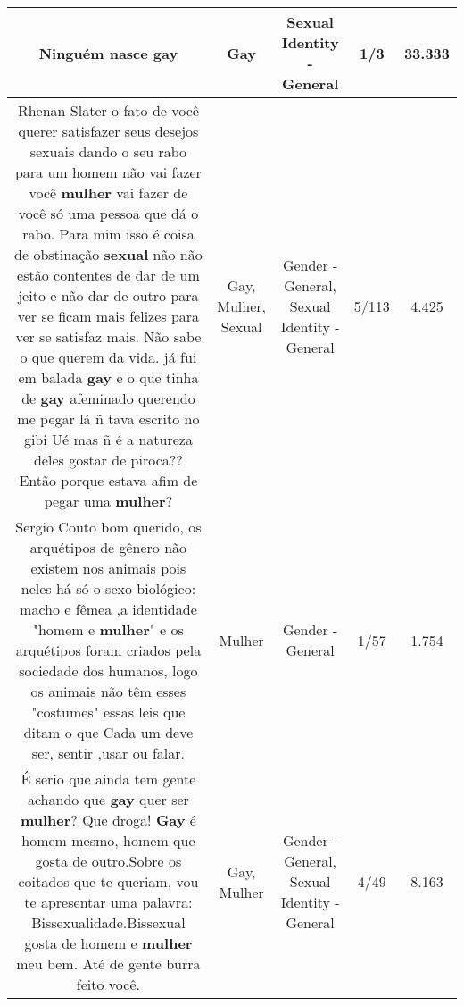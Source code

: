 \documentclass[11pt]{article}
\newlength\mylength
\begin{document}
\begin{center}
\begin{longtable}{|C{.65\mylength}|C{.30\mylength}|C{.12\mylength}|C{.12\mylength}|C{.12\mylength}|}
  \small Ninguém nasce gay\normalsize   & Gay & Sexual Identity - General & 1/3 & 33.333 \\  \hline
  \small Rhenan Slater o fato de você querer satisfazer seus desejos sexuais dando o seu rabo para um homem não vai fazer você \textbf{mulher} vai fazer de você só uma pessoa que dá o rabo. Para mim isso é coisa de obstinação \textbf{sexual} não não estão contentes de dar de um jeito e não dar de outro para ver se ficam mais felizes para ver se satisfaz mais. Não sabe o que querem da vida.  já fui em balada \textbf{gay} e o que tinha de \textbf{gay} afeminado querendo me pegar lá ñ tava escrito no gibi Ué mas ñ é a natureza deles gostar de piroca?? Então porque estava afim de pegar uma \textbf{mulher}?\normalsize   & Gay, Mulher, Sexual & Gender - General, Sexual Identity - General & 5/113 & 4.425 \\  \hline
  \small Sergio Couto bom querido, os arquétipos de gênero não existem nos animais pois neles há só o sexo biológico: macho e fêmea ,a identidade "homem e \textbf{mulher}" e os arquétipos foram criados pela sociedade dos humanos, logo os animais não têm esses "costumes" essas leis que ditam o que Cada um deve ser, sentir ,usar ou falar.\normalsize   & Mulher & Gender - General & 1/57 & 1.754 \\  \hline
  \small É serio que ainda tem gente achando que \textbf{gay} quer ser \textbf{mulher}? Que droga! \textbf{Gay} é homem mesmo, homem que gosta de outro.Sobre os coitados que te queriam, vou te apresentar uma palavra: Bissexualidade.Bissexual gosta de homem e \textbf{mulher} meu bem. Até de gente burra feito você.\normalsize   & Gay, Mulher & Gender - General, Sexual Identity - General & 4/49 & 8.163 \\  \hline

\end{longtable}
\end{center}
\end{document}

